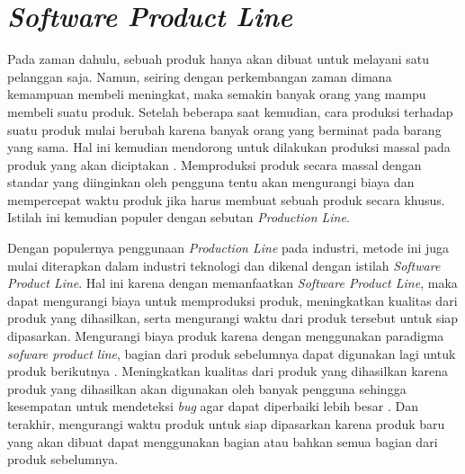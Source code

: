 \section{\textit{Software Product Line}}

Pada zaman dahulu, sebuah produk hanya akan dibuat untuk melayani satu pelanggan saja. Namun, seiring dengan perkembangan zaman dimana kemampuan membeli meningkat, maka semakin banyak orang yang mampu membeli suatu produk. Setelah beberapa saat kemudian, cara produksi terhadap suatu produk mulai berubah karena banyak orang yang berminat pada barang yang sama. Hal ini kemudian mendorong untuk dilakukan produksi massal pada produk yang akan diciptakan \citep{book.sple}. Memproduksi produk secara massal dengan standar yang diinginkan oleh pengguna tentu akan mengurangi biaya dan mempercepat waktu produk jika harus membuat sebuah produk secara khusus. Istilah ini kemudian populer dengan sebutan \textit{Production Line}.
	
Dengan populernya penggunaan \textit{Production Line} pada industri, metode ini juga mulai diterapkan dalam industri teknologi dan dikenal dengan istilah \textit{Software Product Line}. Hal ini karena dengan memanfaatkan \textit{Software Product Line}, maka dapat mengurangi biaya untuk memproduksi produk, meningkatkan kualitas dari produk yang dihasilkan, serta mengurangi waktu dari produk tersebut untuk siap dipasarkan. Mengurangi biaya produk karena dengan menggunakan paradigma \textit{sofware product line}, bagian dari produk sebelumnya dapat digunakan lagi untuk produk berikutnya \citep{book.sple}. Meningkatkan kualitas dari produk yang dihasilkan karena produk yang dihasilkan akan digunakan oleh banyak pengguna sehingga kesempatan untuk mendeteksi \textit{bug} agar dapat diperbaiki lebih besar \citep{book.sple}. Dan terakhir, mengurangi waktu produk untuk siap dipasarkan karena produk baru yang akan dibuat dapat menggunakan bagian atau bahkan semua bagian dari produk sebelumnya.


